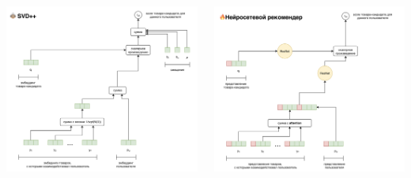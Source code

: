 \documentclass[11pt,aspectratio=169]{beamer}
\begin{document}
\begin{frame}

\begin{columns}
\begin{column}{0.47\textwidth} 
\begin{center}
\includegraphics[scale=0.25]{images/svdpp.png}
\end{center}
\end{column}
\begin{column}{0.47\textwidth} \pause
\begin{center}
\includegraphics[scale=0.25]{images/nn.png}
\end{center}
\end{column}
\end{columns}

\end{frame}
\end{document}
